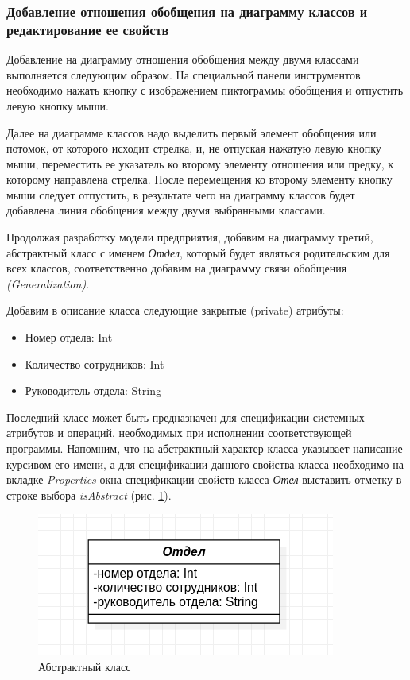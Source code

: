\documentclass[a4paper,12pt]{extreport}
\begin{document}
\subsubsection*{Добавление отношения обобщения на диаграмму классов и редактирование ее свойств}
Добавление на диаграмму отношения обобщения между двумя классами выполняется следующим образом. На специальной панели инструментов необходимо нажать кнопку с изображением пиктограммы обобщения и отпустить левую кнопку мыши. 

Далее на диаграмме классов надо выделить первый элемент обобщения или потомок, от которого исходит стрелка, и, не отпуская нажатую левую кнопку мыши, переместить ее указатель ко второму элементу отношения или предку, к которому направлена стрелка. После перемещения ко второму элементу кнопку мыши следует отпустить, в результате чего на диаграмму классов будет добавлена линия обобщения между двумя выбранными классами.

Продолжая разработку модели предприятия, добавим на диаграмму третий, абстрактный класс с именем \textit{Отдел}, который будет являться родительским для всех классов, соответственно добавим на диаграмму связи обобщения \textit{(Generalization)}. 

Добавим в описание класса следующие закрытые (private) атрибуты:
\begin{itemize}
	\item Номер отдела: Int
	\item Количество сотрудников: Int
	\item Руководитель отдела: String
\end{itemize}

Последний класс может быть предназначен для спецификации системных атрибутов и операций, необходимых при исполнении соответствующей программы. Напомним, что на абстрактный характер класса указывает написание курсивом его имени, а для спецификации данного свойства класса необходимо на вкладке \textit{Properties} окна спецификации свойств класса \textit{Отел} выставить отметку в строке выбора \textit{isAbstract} (рис. \ref{fig:department}).

\begin{figure}
	\centering
	\includegraphics[width=0.5\linewidth]{images/department}
	\caption{Абстрактный класс}
	\label{fig:department}
\end{figure}
\end{document}

